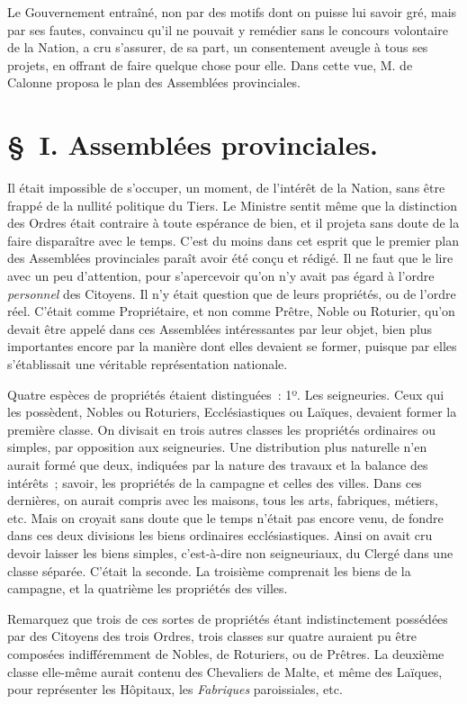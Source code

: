 \documentclass[french,twoside]{book} %
\newcommand\chaptercont{} %
\begin{document}
\chaptercont
\noindent Le Gouvernement entraîné, non par des motifs dont on puisse lui savoir gré, mais par ses fautes, convaincu qu’il ne pouvait y remédier sans le concours volontaire de la Nation, a cru s’assurer, de sa part, un consentement aveugle à tous ses projets, en offrant de faire quelque chose pour elle. Dans cette vue, M. de Calonne proposa le plan des Assemblées provinciales.\par
\section[{§ I. Assemblées provinciales.}]{§ I. Assemblées provinciales.}
\noindent Il était impossible de s’occuper, un moment, de l’intérêt de la Nation, sans être frappé de la nullité politique du Tiers. Le Ministre sentit même que la distinction des Ordres était contraire à toute espérance de bien, et il projeta sans doute de la faire disparaître avec le temps. C’est du moins dans cet esprit que le premier plan des Assemblées provinciales paraît avoir été conçu et rédigé. Il ne faut que le lire avec un peu d’attention, pour s’apercevoir qu’on n’y avait pas égard à l’ordre {\itshape personnel} des Citoyens. Il n’y était question que de leurs propriétés, ou de l’ordre réel. C’était comme Propriétaire, et non comme Prêtre, Noble ou Roturier, qu’on devait être appelé dans ces Assemblées intéressantes par leur objet, bien plus importantes encore par la manière dont elles devaient se former, puisque par elles s’établissait une véritable représentation nationale.\par
Quatre espèces de propriétés étaient distinguées : 1º. Les seigneuries. Ceux qui les possèdent, Nobles ou Roturiers, Ecclésiastiques ou Laïques, devaient former la première classe. On divisait en trois autres classes les propriétés ordinaires ou simples, par opposition aux seigneuries. Une distribution plus naturelle n’en aurait formé que deux, indiquées par la nature des travaux et la balance des intérêts ; savoir, les propriétés de la campagne et celles des villes. Dans ces dernières, on aurait compris avec les maisons, tous les arts, fabriques, métiers, etc. Mais on croyait sans doute que le temps n’était pas encore venu, de fondre dans ces deux divisions les biens ordinaires ecclésiastiques. Ainsi on avait cru devoir laisser les biens simples, c’est-à-dire non seigneuriaux, du Clergé dans une classe séparée. C’était la seconde. La troisième comprenait les biens de la campagne, et la quatrième les propriétés des villes.\par
Remarquez que trois de ces sortes de propriétés étant indistinctement possédées par des Citoyens des trois Ordres, trois classes sur quatre auraient pu être composées indifféremment de Nobles, de Roturiers, ou de Prêtres. La deuxième classe elle-même aurait contenu des Chevaliers de Malte, et même des Laïques, pour représenter les Hôpitaux, les {\itshape Fabriques} paroissiales, etc.\par
\end{document}
